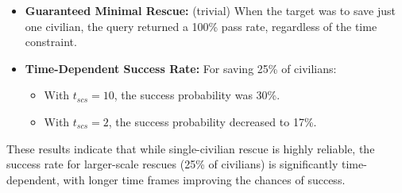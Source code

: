 \begin{itemize}
	\item \textbf{Guaranteed Minimal Rescue:} (trivial) When the target was to save just one civilian, the query returned a 100\% pass rate, regardless of the time constraint.
	\item \textbf{Time-Dependent Success Rate:} For saving 25\% of civilians:
	\begin{itemize}
		\item With $t_{scs} = 10$, the success probability was 30\%.
		\item With $t_{scs} = 2$, the success probability decreased to 17\%.
	\end{itemize}
\end{itemize}

These results indicate that while single-civilian rescue is highly reliable, the success rate for larger-scale rescues (25\% of civilians) is significantly time-dependent, with longer time frames improving the chances of success.